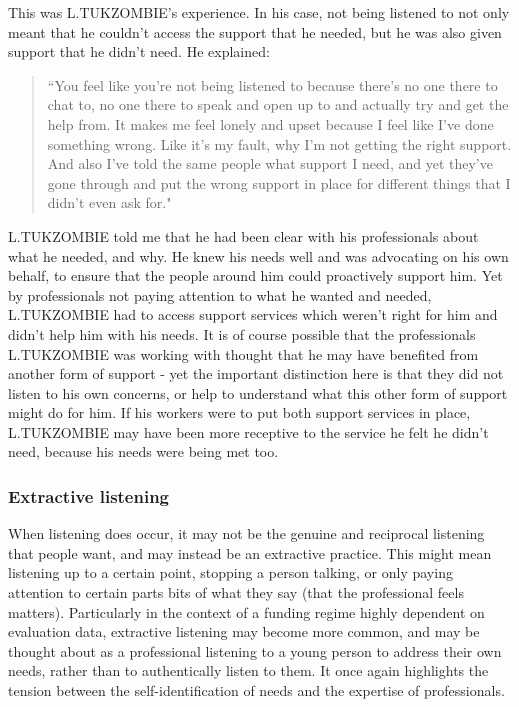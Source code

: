 This was L.TUKZOMBIE’s experience. In his case, not being listened to not only meant that he couldn’t access the support that he needed, but he was also given support that he didn’t need. He explained: 
\begin{quote}
“You feel like you're not being listened to because there's no one there to chat to, no one there to speak and open up to and actually try and get the help from. It makes me feel lonely and upset because I feel like I've done something wrong. Like it's my fault, why I'm not getting the right support. And also I've told the same people what support I need, and yet they've gone through and put the wrong support in place for different things that I didn't even ask for."
\end{quote}

L.TUKZOMBIE told me that he had been clear with his professionals about what he needed, and why. He knew his needs well and was advocating on his own behalf, to ensure that the people around him could proactively support him. Yet by professionals not paying attention to what he wanted and needed, L.TUKZOMBIE had to access support services which weren't right for him and didn't help him with his needs. It is of course possible that the professionals L.TUKZOMBIE was working with thought that he may have benefited from another form of support - yet the important distinction here is that they did not listen to his own concerns, or help to understand what this other form of support might do for him. If his workers were to put both support services in place, L.TUKZOMBIE may have been more receptive to the service he felt he didn't need, because his needs were being met too.

\subsubsection{Extractive listening}

When listening does occur, it may not be the genuine and reciprocal listening that people want, and may instead be an extractive practice. This might mean listening up to a certain point, stopping a person talking, or only paying attention to certain parts bits of what they say (that the professional feels matters). Particularly in the context of a funding regime highly dependent on evaluation data, extractive listening may become more common, and may be thought about as a professional listening to a young person to address their own needs, rather than to authentically listen to them. It once again highlights the tension between the self-identification of needs and the expertise of professionals. 

